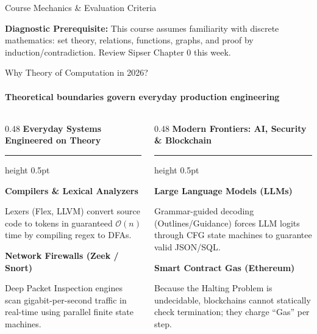 \documentclass[aspectratio=169, 10pt]{beamer}
\newcommand{\colheader}[1]{%
  {\noindent\footnotesize\bfseries\color{gimpanavy}#1}%
  \vspace{0.02cm}%
  {\color{gimpanavy!30}\hrule height 0.5pt}%
  \vspace{0.05cm}%
}
\newcommand{\cardtitle}[1]{{\noindent\footnotesize\bfseries\color{gimpanavy}#1}\par\vspace{0.03cm}}
\begin{document}
\begin{frame}{Course Mechanics \& Evaluation Criteria}
  \vspace{0.10cm}
  \begin{tcolorbox}[quizcard]
    {\scriptsize\textbf{Diagnostic Prerequisite:} This course assumes familiarity with discrete mathematics: set theory, relations, functions, graphs, and proof by induction/contradiction. Review Sipser Chapter 0 this week.}
  \end{tcolorbox}
\end{frame}

\begin{frame}{Why Theory of Computation in 2026?}
  \framesubtitle{Theoretical boundaries govern everyday production engineering}
  
  \begin{columns}[T]
    \begin{column}{0.48\textwidth}
      \colheader{Everyday Systems Engineered on Theory}
      \begin{tcolorbox}[conceptcard]
        \cardtitle{Compilers \& Lexical Analyzers}
        {\scriptsize
        Lexers (Flex, LLVM) convert source code to tokens in guaranteed $\mathcal{O}(n)$ time by compiling regex to DFAs.
        }
        \vspace{0.06cm}
        
        \cardtitle{Network Firewalls (Zeek / Snort)}
        {\scriptsize
        Deep Packet Inspection engines scan gigabit-per-second traffic in real-time using parallel finite state machines.
        }
      \end{tcolorbox}
    \end{column}
    
    \begin{column}{0.48\textwidth}
      \colheader{Modern Frontiers: AI, Security \& Blockchain}
      \begin{tcolorbox}[spotlightcard]
        \cardtitle{Large Language Models (LLMs)}
        {\scriptsize
        Grammar-guided decoding (Outlines/Guidance) forces LLM logits through CFG state machines to guarantee valid JSON/SQL.
        }
        \vspace{0.06cm}
        
        \cardtitle{Smart Contract Gas (Ethereum)}
        {\scriptsize
        Because the Halting Problem is undecidable, blockchains cannot statically check termination; they charge ``Gas'' per step.
        }
      \end{tcolorbox}
    \end{column}
  \end{columns}
  

\end{frame}
\end{document}
